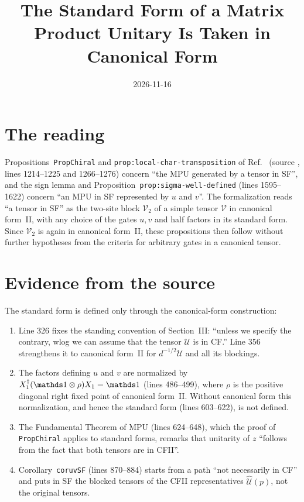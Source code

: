 \documentclass{article}
\title{The Standard Form of a Matrix Product Unitary Is Taken in Canonical Form}
\author{}
\date{2026-11-16}
\begin{document}
\maketitle
{}

\section{The reading}

Propositions~\texttt{PropChiral} and \texttt{prop:local-char-transposition}
of Ref.~\cite{Cirac2017MPU} (source ,
lines 1214--1225 and 1266--1276) concern ``the MPU generated by a tensor in
SF'', and the sign lemma and Proposition~\texttt{prop:sigma-well-defined}
(lines 1595--1622) concern ``an MPU in SF represented by $u$ and $v$''. The
formalization reads ``a tensor in SF'' as the two-site block $\mathcal V_2$ of
a simple tensor $\mathcal V$ in canonical form~II, with any choice of the
gates $u,v$ and half factors in its standard form. Since $\mathcal V_2$ is
again in canonical form~II, these propositions then follow without further
hypotheses from the criteria for arbitrary gates in a canonical tensor.

\section{Evidence from the source}

The standard form is defined only through the canonical-form construction:
\begin{enumerate}
    \item Line 326 fixes the standing convention of Section~III: ``unless we
          specify the contrary, wlog we can assume that the tensor $\mathcal U$
          is in CF.'' Line 356 strengthens it to canonical form~II for
          $d^{-1/2}\mathcal U$ and all its blockings.
    \item The factors defining $u$ and $v$ are normalized by
          $X_1^\dagger(\Id\otimes\rho)X_1=\Id$ (lines 486--499), where $\rho$
          is the positive diagonal right fixed point of canonical form~II.
          Without canonical form this normalization, and hence the standard
          form (lines 603--622), is not defined.
    \item The Fundamental Theorem of MPU (lines 624--648), which the proof of
          \texttt{PropChiral} applies to standard forms, remarks that unitarity
          of $z$ ``follows from the fact that both tensors are in CFII''.
    \item Corollary~\texttt{coruvSF} (lines 870--884) starts from a path ``not
          necessarily in CF'' and puts in SF the blocked tensors of the CFII
          representatives $\hat{\mathcal U}(p)$, not the original tensors.
\end{enumerate}
\end{document}
